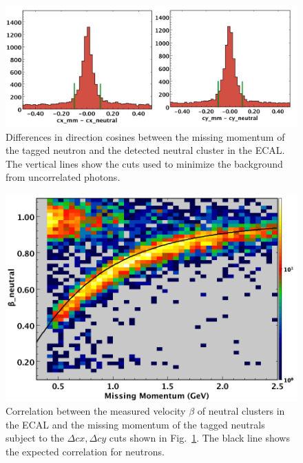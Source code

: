 \begin{figure}[h]
\centering
\includegraphics[width=1.0\columnwidth,keepaspectratio]{img/S10_4_1.png}
\caption[]{Differences in direction cosines between the missing momentum of the tagged neutron and the detected
  neutral cluster in the ECAL. The vertical lines show the cuts used to minimize the background from uncorrelated
  photons.}
\label{fig:S10_4_1}
\end{figure}

\begin{figure}[h]
\centering
\includegraphics[width=1.0\columnwidth,keepaspectratio]{img/S10_4_2.png}
\caption[]{Correlation between the measured velocity $\beta$ of neutral clusters in the ECAL and the missing
  momentum of the tagged neutrals subject to the $\Delta cx,\Delta cy$ cuts shown in Fig.~\ref{fig:S10_4_1}.
  The black line shows the expected correlation for neutrons.}
\label{fig:S10_4_2}
\end{figure}

